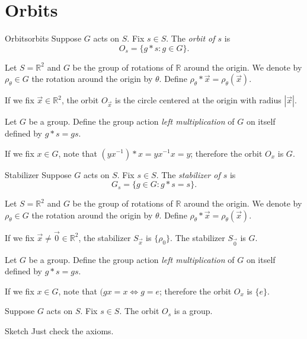 \section{Orbits}

\begin{defn}{Orbits}{orbits}
  Suppose \(G\) acts on \(S\). Fix \(s \in S\). The \emph{orbit of \(s\)} is
  \[
    O_s = \{g * s : g \in G\}.
  \] 
\end{defn}

\begin{exmp}{}{}
  Let \(S = \mathbb{R}^2\) and \(G\) be the group of rotations of \(\mathbb{R}\) around the origin.
  We denote by \(\rho_\theta \in G\) the rotation around the origin by \(\theta\).
  Define \(\rho_\theta * \vec x = \rho_\theta(\vec x)\).

  If we fix \(\vec x \in \mathbb{R}^2\), the orbit \(O_{\vec x}\) is the circle centered at the origin with radius  \(\left|\vec x\right|\).
\end{exmp}

\begin{exmp}{}{}
	Let \(G\) be a group. Define the group action \emph{left multiplication} of \(G\) on itself defined by \(g * s = gs\).

    If we fix \(x \in G\), note that \((yx^{-1})*x=yx^{-1}x=y\); therefore the orbit \(O_x\) is \(G\).
\end{exmp}

\begin{defn}{Stabilizer}{}
  Suppose \(G\) acts on \(S\). Fix \(s \in S\). The \emph{stabilizer of \(s\)} is
  \[
    G_s = \{g \in G : g * s = s\}.
  \] 
\end{defn}

\begin{exmp}{}{}
  Let \(S = \mathbb{R}^2\) and \(G\) be the group of rotations of \(\mathbb{R}\) around the origin.
  We denote by \(\rho_\theta \in G\) the rotation around the origin by \(\theta\).
  Define \(\rho_\theta * \vec x = \rho_\theta(\vec x)\).

  If we fix \(\vec x \neq \vec 0 \in \mathbb{R}^2\), the stabilizer \(S_{\vec x}\) is \(\{\rho_0\}\).
  The stabilizer \(S_{\vec 0}\) is \(G\).
\end{exmp}

\begin{exmp}{}{}
	Let \(G\) be a group. Define the group action \emph{left multiplication} of \(G\) on itself defined by \(g * s = gs\).

    If we fix \(x \in G\), note that \((gx=x \iff g=e\); therefore the orbit \(O_x\) is \(\{e\}\).
\end{exmp}

\begin{prop}{}{}
  Suppose \(G\) acts on \(S\). Fix \(s \in S\). The orbit \(O_s\) is a group.
\end{prop}

\begin{dem}{Sketch}{}
  Just check the axioms.
\end{dem}
